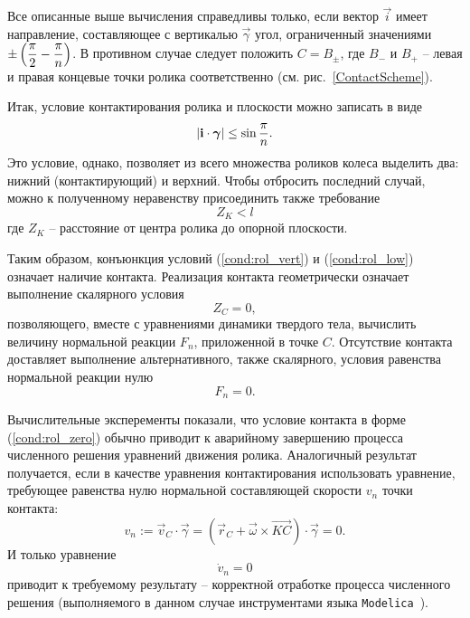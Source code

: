 Все описанные выше вычисления справедливы только, если вектор $\vec{i}$ имеет направление, составляющее с вертикалью $\vec{\gamma}$ угол, ограниченный значениями $\pm\left(\displaystyle\frac{\displaystyle \pi}{\displaystyle 2} - \displaystyle\frac{\displaystyle \pi}{\displaystyle n}\right)$. В противном случае следует положить $C = B_\pm$, где $B_{-}$ и $B_{+}$ -- левая и правая концевые точки ролика соответственно (см. рис.~\ref{ContactScheme}).

Итак, условие контактирования ролика и плоскости можно записать в виде
\begin{equation}\label{cond:rol_vert}
    \left| \boldsymbol{\mathbf{i}} \cdot \boldsymbol{\mathbf{\gamma}} \right| \le \sin\displaystyle\frac{\displaystyle \pi}{\displaystyle n}.
\end{equation}
Это условие, однако, позволяет из всего множества роликов колеса выделить два: нижний (контактирующий) и верхний. Чтобы отбросить последний случай, можно к полученному неравенству присоединить также требование 
\begin{equation}\label{cond:rol_low}
    Z_K < l
\end{equation}
где $Z_K$ -- расстояние от центра ролика до опорной плоскости.

Таким образом, конъюнкция условий (\ref{cond:rol_vert}) и (\ref{cond:rol_low}) означает наличие контакта. Реализация контакта геометрически означает выполнение скалярного условия
\begin{equation}\label{cond:rol_zero}
    Z_C = 0,
\end{equation}
позволяющего, вместе с уравнениями динамики твердого тела, вычислить величину нормальной реакции $F_n$, приложенной в точке $C$. Отсутствие контакта доставляет выполнение альтернативного, также скалярного, условия равенства нормальной реакции нулю
$$
    F_n = 0.
$$

Вычислительные эксперементы показали, что условие контакта в форме (\ref{cond:rol_zero}) обычно приводит к аварийному завершению процесса численного решения уравнений движения ролика. Аналогичный результат получается, если в качестве уравнения контактирования использовать уравнение, требующее равенства нулю нормальной составляющей скорости $v_n$ точки контакта: 
\begin{equation}\label{eq:cont_vn}
    v_n := \vec{v}_C \cdot \vec{\gamma} = \left(\vec{r}_C + \vec{\omega} \times \overrightarrow{KC}\right) \cdot \vec{\gamma} = 0.
\end{equation}
И только уравнение
\begin{equation}\label{eq:cont_Dvn}
    \dot{v}_n = 0
\end{equation}
приводит к требуемому результату -- корректной отработке процесса численного решения (выполняемого в данном случае инструментами языка \texttt{Modelica}~\cite{Fritzson}).


